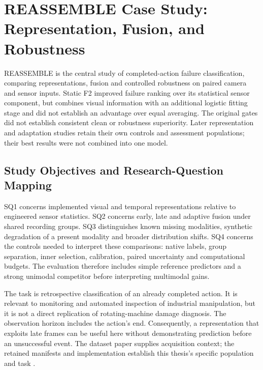 \chapter{REASSEMBLE Case Study: Representation, Fusion, and Robustness}
\label{ch:reassemble}
REASSEMBLE is the central study of completed-action failure classification, comparing
representations, fusion and controlled robustness on paired camera and sensor inputs.
Static F2 improved failure ranking over its statistical sensor component, but combines
visual information with an additional logistic fitting stage and did not establish an
advantage over equal averaging. The original gates did not establish consistent clean
or robustness superiority. Later representation and adaptation studies retain their own
controls and assessment populations; their best results were not combined into one
model.

\section{Study Objectives and Research-Question Mapping}
SQ1 concerns implemented visual and temporal representations relative to engineered
sensor statistics. SQ2 concerns early, late and adaptive fusion under shared recording
groups. SQ3 distinguishes known missing modalities, synthetic degradation of a present
modality and broader distribution shifts. SQ4 concerns the controls needed to interpret
these comparisons: native labels, group separation, inner selection, calibration, paired
uncertainty and computational budgets. The evaluation therefore includes simple
reference predictors and a strong unimodal competitor before interpreting multimodal
gains.

The task is retrospective classification of an already completed action. It is relevant
to monitoring and automated inspection of industrial manipulation, but it is not a
direct replication of rotating-machine damage diagnosis. The observation horizon
includes the action's end. Consequently, a representation that exploits late frames can
be useful here without demonstrating prediction before an unsuccessful event. The
dataset paper supplies acquisition context; the retained manifests and implementation
establish this thesis's specific population and task
\parencite{Sliwowski2025REASSEMBLE}.

